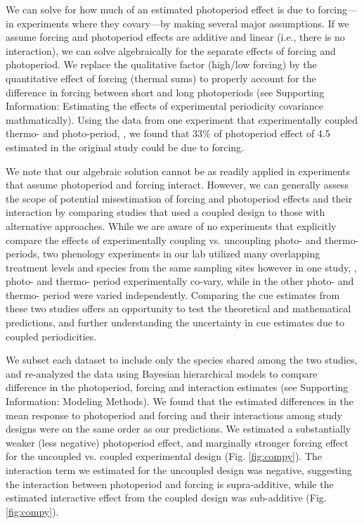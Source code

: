 \documentclass[11pt]{article}
\begin{document}
We can solve for how much of an estimated photoperiod effect is due to forcing---in experiments where they covary---by making several major assumptions. If we assume forcing and photoperiod effects are additive and linear (i.e., there is no interaction), we can solve algebraically for the separate effects of forcing and photoperiod.  We replace the qualitative factor (high/low forcing) by the quantitative effect of forcing (thermal sums) to properly account for the difference in forcing between short and long photoperiods (see Supporting Information: Estimating the effects of experimental periodicity covariance mathmatically). Using the data from one experiment that experimentally coupled thermo- and photo-period, \citet{Flynn2018}, we found that 33\% of photoperiod effect of 4.5 estimated in the original study could be due to forcing. 

We note that our algebraic solution cannot be as readily applied in experiments that assume photoperiod and forcing interact. However, we can generally assess the scope of potential misestimation of forcing and photoperiod effects and their interaction by comparing studies that used a coupled design to those with alternative approaches. While we are aware of no experiments that explicitly compare the effects of experimentally coupling vs. uncoupling photo- and thermo- periods, two phenology experiments in our lab utilized many overlapping treatment levels and species from the same sampling sites however in one study, \citet{Flynn2018}, photo- and thermo- period experimentally co-vary, while in the other \citet{Buonaiuto:2021ug}  photo- and thermo- period were varied independently. Comparing the cue estimates from these two studies offers an opportunity to test the theoretical and mathematical predictions, and further understanding the uncertainty in cue estimates due to coupled periodicities.

We subset each dataset to include only the species shared among the two studies, and re-analyzed the data using Bayesian hierarchical models to compare difference in the photoperiod, forcing and interaction estimates (see Supporting Information: Modeling Methods). We found that the estimated differences in the mean response to photoperiod and forcing and their interactions among study designs were on the same order as our predictions. We estimated a substantially weaker (less negative) photoperiod effect, and marginally stronger forcing effect for the uncoupled vs. coupled experimental design (Fig. \ref{fig:compy}). The interaction term we estimated for the uncoupled design was negative, suggesting the interaction between photoperiod and forcing is supra-additive, while the estimated interactive effect from the coupled design was sub-additive (Fig. \ref{fig:compy}).
\end{document}
